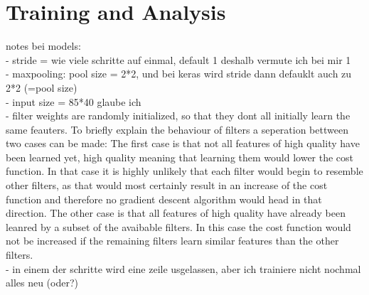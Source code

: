 \chapter{Training and Analysis}
notes bei models:\\
- stride = wie viele schritte auf einmal, default 1 deshalb vermute ich bei mir 1\\
- maxpooling: pool size = 2*2, und bei keras wird stride dann defauklt auch zu 2*2 (=pool size)\\
- input size = 85*40 glaube ich\\
- filter weights are randomly initialized, so that they dont all initially learn the same feauters. To briefly explain the behaviour of filters a seperation bettween two cases can be made: The first case is that not all features of high quality have been learned yet, high quality meaning that learning them would lower the cost function. In that case it is highly unlikely that each filter would begin to resemble other filters, as that would most certainly result in an increase of the cost function and therefore no gradient descent algorithm would head in that direction. The other case is that all features of high quality have already been leanred by a subset of the avaibable filters. In this case the cost function would not be increased if the remaining filters learn similar features than the other filters. \\
- in einem der schritte wird eine zeile usgelassen, aber ich trainiere nicht nochmal alles neu (oder?)
